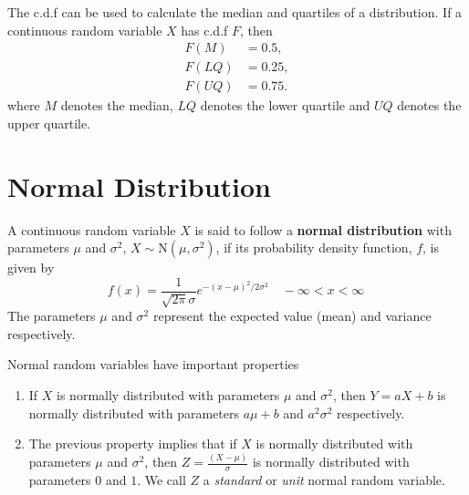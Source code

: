 \begin{prop} \label{mod2:prop:ContinuousRV:CDF}
	The c.d.f can be used to calculate the median and quartiles of a distribution. If a continuous random variable $X$ has c.d.f $F$,  then 
	\begin{align}
	F(M) &= 0.5, \\
	F(LQ) &= 0.25, \\
	F(UQ) &= 0.75.
	\end{align}	
	where $M$ denotes the median, $LQ$ denotes the lower quartile and $UQ$ denotes the upper quartile.
\end{prop}
		




\section{Normal Distribution}\label{mod2:section:Normal}

\begin{defn}\label{mod2:defn:Normal}
	A continuous random variable $X$ is said to follow a \textbf{normal distribution} with parameters $\mu$ and $\sigma^2$, $X \sim \text{N}(\mu,\sigma^2)$, if its probability density function, $f$, is given by
	\begin{equation}
	f(x) = \frac{1}{\sqrt{2 \pi}\sigma} e^{-(x-\mu)^2/2\sigma^2} \quad -\infty < x < \infty  \label{mod2:eq:Normal}\
	\end{equation}
	The parameters $\mu$ and $\sigma^2$ represent the expected value (mean) and variance respectively.
\end{defn}

\begin{note} \label{mod2:note:Normal:Properties}
	Normal random variables have important properties
	\begin{enumerate}[label = (\roman*)]
		\item If $X$ is normally distributed with parameters $\mu$ and $\sigma^2$, then $Y = aX + b$ is normally distributed with parameters $a\mu + b$ and $a^2\sigma^2$ respectively. \label{mod2:note:Normal:Property1}
		\item The previous property implies that if $X$ is normally distributed with parameters $\mu$ and $\sigma^2$, then $Z=\frac{(X-\mu)}{\sigma}$ is normally distributed with parameters $0$ and $1$. We call $Z$ a \textit{standard} or \textit{unit} normal random variable. \label{mod2:note:Normal:Property2}
	\end{enumerate}
\end{note}


